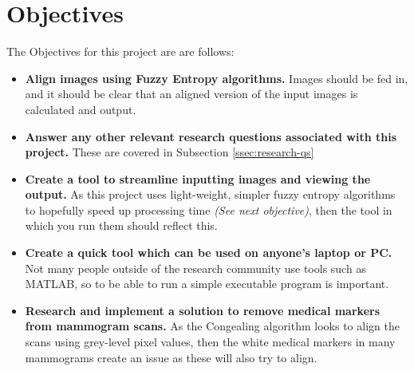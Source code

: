\section{Objectives}
\label{sec:objectives}

The Objectives for this project are are follows:

\begin{itemize}
  \item \textbf{Align images using Fuzzy Entropy algorithms.} Images should be fed in, and it should be clear that an aligned version of the input images is calculated and output.
  \item \textbf{Answer any other relevant research questions associated with this project.} These are covered in Subsection \ref{ssec:research-qs}
  \item \textbf{Create a tool to streamline inputting images and viewing the output.} As this project uses light-weight, simpler fuzzy entropy algorithms to hopefully speed up processing time \textit{(See next objective)}, then the tool in which you run them should reflect this.
  \item \textbf{Create a quick tool which can be used on anyone's laptop or PC.} Not many people outside of the research community use tools such as MATLAB, so to be able to run a simple executable program is important.
  \item \textbf{Research and implement a solution to remove medical markers from mammogram scans.} As the \Gls{Congealing} algorithm looks to align the scans using grey-level pixel values, then the white medical markers in many mammograms create an issue as these will also try to align.
\end{itemize}
